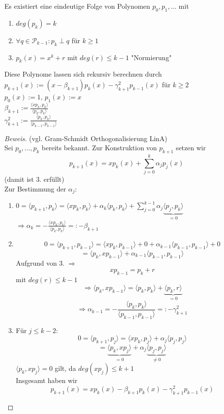 \begin{theorem}
Es existiert eine eindeutige Folge von Polynomen $p_0, p_1, ...$ mit 
\begin{enumerate}
  \item $deg(p_k) = k$
  \item $\forall q \in \mathcal{P}_{k-1}:p_k \perp q$ für $k \geq 1$
  \item $p_k(x) = x^k + r$ mit $deg(r) \leq  k-1$ "Normierung"
\end{enumerate}
Diese Polynome lassen sich rekursiv berechnen durch \\
$ p_{k+1}(x) := (x- \beta_{k+1}) p_k(x) - \gamma_{k+1}^2 p_{k-1}(x)$ für $k \geq 2$ \\
$ p_0(x) := 1$, $p_{1}(x) := x$ \\
$ \beta_{k+1} := \frac{\langle xp_k, p_k \rangle}{\langle p_k, p_k \rangle}$ \\
$ \gamma_{k+1}^2 := \frac{\langle p_k, p_k \rangle}{\langle p_{k-1}, p_{k-1} \rangle}$
\begin{proof}[Beweis]
(vgl. Gram-Schmidt Orthogonalisierung LinA) \\
Sei $p_0, ..., p_k$ bereits bekannt. Zur Konstruktion von $p_{k+1}$ setzen wir
$$p_{k+1}(x) = xp_k(x) + \sum_{j=0}^{k} \alpha_j p_j(x)$$
(damit ist 3. erfüllt) \\
Zur Bestimmung der $\alpha_j$:
\begin{enumerate}
  \item $ 0 = \langle p_{k+1}, p_k \rangle = \langle xp_k, p_k \rangle + \alpha_k \langle p_k, p_k \rangle + \sum_{j=0}^{k-1} \alpha_j \underbrace{\langle p_j, p_k \rangle}_{= 0}$\\
    $\Rightarrow \alpha_k = -\frac{\langle xp_k, p_k \rangle}{\langle p_k, p_k \rangle} =: -\beta_{k+1}$
  
  \item $$0 = \langle p_{k+1}, p_{k-1} \rangle = \langle xp_k, p_{k-1} \rangle + 0 + \alpha_{k-1} \langle p_{k-1}, p_{k-1} \rangle + 0$$ 
    $$= \langle p_{k}, xp_{k-1} \rangle + \alpha_{k-1} \langle p_{k-1}, p_{k-1} \rangle$$ 
    Aufgrund von 3. $\Rightarrow$ 
    $$xp_{k-1} = p_k + r$$ mit $deg(r) \leq k-1$
    $$\Rightarrow \langle p_{k}, xp_{k-1} \rangle = \langle p_{k}, p_{k} \rangle + \underbrace{\langle p_{k}, r \rangle}_{= 0}$$ 
    $$\Rightarrow \alpha_{k-1} = - \frac{\langle p_k, p_k \rangle}{\langle p_{k-1}, p_{k-1} \rangle} =: -\gamma_{k+1}^2$$
  
  \item Für $j \leq k-2$:
    $$ 0 = \langle p_{k+1}, p_{j} \rangle = \langle xp_{k}, p_{j} \rangle + \alpha_j \langle p_{j}, p_{j} \rangle$$
    $$ = \underbrace{\langle p_{k}, xp_{j} \rangle}_{= 0} + \alpha_j \underbrace{\langle p_{j}, p_{j} \rangle}_{\neq 0}$$
    $\langle p_{k}, xp_{j} \rangle = 0$ gilt, da $deg(xp_j) \leq k+1$ \\
    Insgesamt haben wir
    $$p_{k+1}(x) = xp_k(x) - \beta_{k+1}p_k(x) - \gamma_{k+1}^2 p_{k-1}(x)$$
\end{enumerate}
\end{proof}
\end{theorem}

